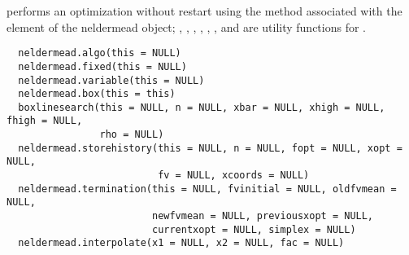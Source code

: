 %
\begin{Description}\relax
{} performs an optimization without restart using the
method associated with the  element of the neldermead object;
, , ,
, ,
, and  are utility
functions for .
\end{Description}
%
\begin{Usage}
\begin{verbatim}
  neldermead.algo(this = NULL)
  neldermead.fixed(this = NULL)
  neldermead.variable(this = NULL)
  neldermead.box(this = this)
  boxlinesearch(this = NULL, n = NULL, xbar = NULL, xhigh = NULL, fhigh = NULL,
                rho = NULL)
  neldermead.storehistory(this = NULL, n = NULL, fopt = NULL, xopt = NULL,
                          fv = NULL, xcoords = NULL)
  neldermead.termination(this = NULL, fvinitial = NULL, oldfvmean = NULL,
                         newfvmean = NULL, previousxopt = NULL,
                         currentxopt = NULL, simplex = NULL)
  neldermead.interpolate(x1 = NULL, x2 = NULL, fac = NULL)
\end{verbatim}
\end{Usage}
%
